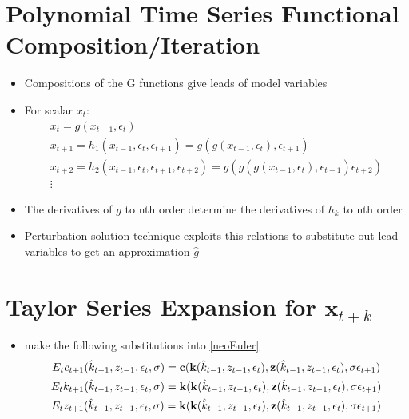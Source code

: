 \documentclass[12pt]{article}
\begin{document}
\section{Polynomial Time Series Functional Composition/Iteration}


  \begin{itemize}
  \item Compositions of the G functions give leads of model variables
  \item For scalar $x_t$:
\begin{gather*}
x_t=  g(x_{t-1},\epsilon_t)\\
x_{t+1}=  h_1(x_{t-1},\epsilon_t,\epsilon_{t+1})= g(g(x_{t-1},\epsilon_t), \epsilon_{t+1})\\ 
x_{t+2}=  h_2(x_{t-1},\epsilon_t,\epsilon_{t+1},\epsilon_{t+2})= g(g(g(x_{t-1},\epsilon_t), \epsilon_{t+1}) \epsilon_{t+2})\\
\vdots
\end{gather*}
\item   The derivatives of $g$ to nth order determine the derivatives of $h_k$ to nth order
\item Perturbation solution technique exploits this relations to substitute out lead variables to get an approximation $\hat{g}$
  \end{itemize}


\section{Taylor Series Expansion for ${\mathbf x_{t+k}}$}

  \begin{itemize} 
 \item make the following substitutions  into \ref{neoEuler}
\begin{gather*}
E_t c_{t+1}(\hat{k}_{t-1},z_{t-1},\epsilon_{t},\sigma)= 
{\bf c}({\bf k}(\hat{k}_{t-1},z_{t-1},\epsilon_{t}),
{\bf z}(\hat{k}_{t-1},z_{t-1},\epsilon_{t}),\sigma \epsilon_{t+1})\\
E_t k_{t+1}(\hat{k}_{t-1},z_{t-1},\epsilon_{t},\sigma)= 
{\bf k}({\bf k}(\hat{k}_{t-1},z_{t-1},\epsilon_{t}),
{\bf z}(\hat{k}_{t-1},z_{t-1},\epsilon_{t}),\sigma \epsilon_{t+1})\\
E_t z_{t+1}(\hat{k}_{t-1},z_{t-1},\epsilon_{t},\sigma)= 
{\bf k}({\bf k}(\hat{k}_{t-1},z_{t-1},\epsilon_{t}),
{\bf z}(\hat{k}_{t-1},z_{t-1},\epsilon_{t}),\sigma \epsilon_{t+1})
\end{gather*}
  \end{itemize}
\end{document}
